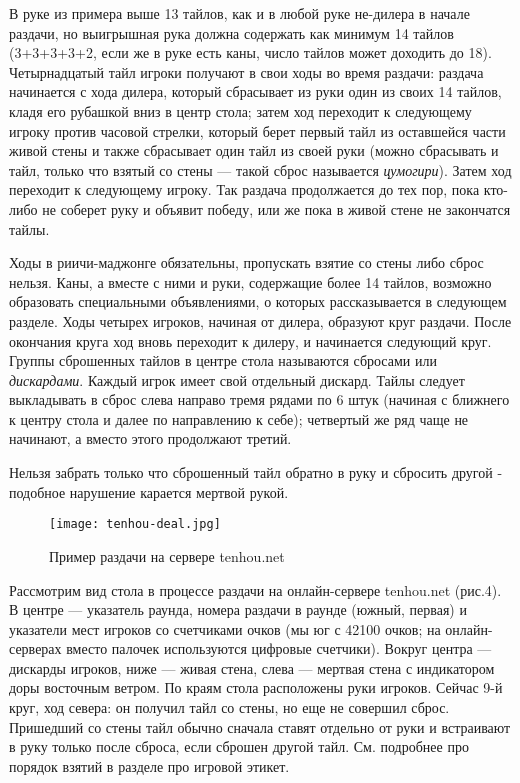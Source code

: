 
В руке из примера выше 13 тайлов, как и в любой руке не-дилера в начале раздачи, но выигрышная рука должна содержать как минимум 14 тайлов (3+3+3+3+2, если же в руке есть каны, число тайлов может доходить до 18). Четырнадцатый тайл игроки получают в свои ходы во время раздачи: раздача начинается с хода дилера, который сбрасывает из руки один из своих 14 тайлов, кладя его рубашкой вниз в центр стола; затем ход переходит к следующему игроку против часовой стрелки, который берет первый тайл из оставшейся части живой стены и также сбрасывает один тайл из своей руки (можно сбрасывать и тайл, только что взятый со стены --- такой сброс называется \textit{цумогири}). Затем ход переходит к следующему игроку. Так раздача продолжается до тех пор, пока кто-либо не соберет руку и объявит победу, или же пока в живой стене не закончатся тайлы. 

Ходы в риичи-маджонге обязательны, пропускать взятие со стены либо сброс нельзя. Каны, а вместе с ними и руки, содержащие более 14 тайлов, возможно образовать специальными объявлениями, о которых рассказывается в следующем разделе. Ходы четырех игроков, начиная от дилера, образуют круг раздачи. После окончания круга ход вновь переходит к дилеру, и начинается следующий круг. Группы сброшенных тайлов в центре стола называются сбросами или \textit{дискардами}. Каждый игрок имеет свой отдельный дискард. Тайлы следует выкладывать в сброс слева направо тремя рядами по 6 штук (начиная с ближнего к центру стола и далее по направлению к себе); четвертый же ряд чаще не начинают, а вместо этого продолжают третий.

Нельзя забрать только что сброшенный тайл обратно в руку и сбросить другой - подобное нарушение карается мертвой рукой.

\begin{figure}[H]
	\centering
	\texttt{[image: tenhou-deal.jpg]}
	\caption{Пример раздачи на сервере tenhou.net}
\end{figure}

Рассмотрим вид стола в процессе раздачи на онлайн-сервере tenhou.net (рис.4). В центре --- указатель раунда, номера раздачи в раунде (южный, первая) и указатели мест игроков со счетчиками очков (мы юг с 42100 очков; на онлайн-серверах вместо палочек используются цифровые счетчики). Вокруг центра --- дискарды игроков, ниже --- живая стена, слева --- мертвая стена с индикатором доры восточным ветром. По краям стола расположены руки игроков. Сейчас 9-й круг, ход севера: он получил тайл со стены, но еще не совершил сброс. Пришедший со стены тайл обычно сначала ставят отдельно от руки и встраивают в руку только после сброса, если сброшен другой тайл. См. подробнее про порядок взятий в разделе про игровой этикет.

